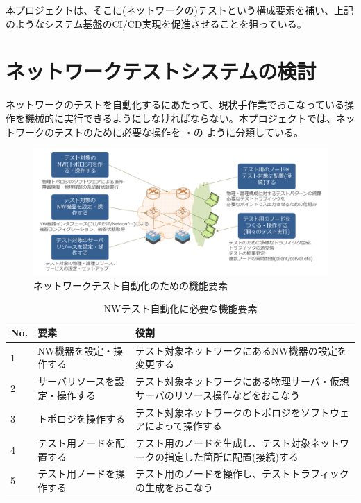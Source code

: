 本プロジェクトは、そこに(ネットワークの)テストという構成要素を補い、上記
のようなシステム基盤のCI/CD実現を促進させることを狙っている。

 \section{ネットワークテストシステムの検討}
 \label{sec:discuss-network-test}


ネットワークのテストを自動化するにあたって、現状手作業でおこなっている操
作を機械的に実行できるようにしなければならない。本プロジェクトでは、ネッ
トワークのテストのために必要な操作を
・の
ように分類している。

\begin{figure}[h]
 \centering
 \includegraphics[scale=0.5]{img/features-of-network-testing.png}
 \caption{ネットワークテスト自動化のための機能要素}
 \label{fig:features-of-network-testing}
\end{figure}

\begin{table}[h]
 \caption{NWテスト自動化に必要な機能要素}
 \label{tab:test-functions}
 \begin{tabularx}{\linewidth}{l|l|X}
  \hline
  No. & 要素 & 役割 \\ \hline
  \hline
  1 & NW機器を設定・操作する & テスト対象ネットワークにあるNW機器の設定を変更する \\ \hline
  2 & サーバリソースを設定・操作する & テスト対象ネットワークにある物理サーバ・仮想サーバのリソース操作などをおこなう \\ \hline
  3 & トポロジを操作する & テスト対象ネットワークのトポロジをソフトウェアによって操作する \\ \hline
  4 & テスト用ノードを配置する & テスト用のノードを生成し、テスト対象ネットワークの指定した箇所に配置(接続)する \\ \hline
  5 &テスト用ノードを操作する & テスト用のノードを操作し、テストトラフィックの生成をおこなう\\ \hline
 \end{tabularx}
\end{table}

